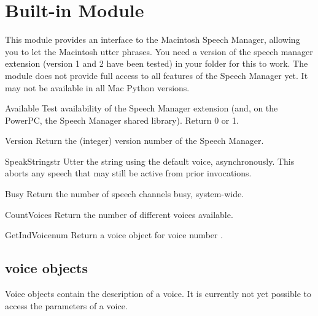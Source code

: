 \section{Built-in Module }

\renewcommand{\indexsubitem}{(in module macspeech)}

This module provides an interface to the Macintosh Speech Manager,
allowing you to let the Macintosh utter phrases. You need a version of
the speech manager extension (version 1 and 2 have been tested) in
your  folder for this to work. The module does not
provide full access to all features of the Speech Manager yet.  It may
not be available in all Mac Python versions.

\begin{funcdesc}{Available}{}
Test availability of the Speech Manager extension (and, on the
PowerPC, the Speech Manager shared library). Return 0 or 1. 
\end{funcdesc}

\begin{funcdesc}{Version}{}
Return the (integer) version number of the Speech Manager.
\end{funcdesc}

\begin{funcdesc}{SpeakString}{str}
Utter the string  using the default voice,
asynchronously. This aborts any speech that may still be active from
prior  invocations.
\end{funcdesc}

\begin{funcdesc}{Busy}{}
Return the number of speech channels busy, system-wide.
\end{funcdesc}

\begin{funcdesc}{CountVoices}{}
Return the number of different voices available.
\end{funcdesc}

\begin{funcdesc}{GetIndVoice}{num}
Return a voice object for voice number .
\end{funcdesc}

\subsection{voice objects}
Voice objects contain the description of a voice. It is currently not
yet possible to access the parameters of a voice.

